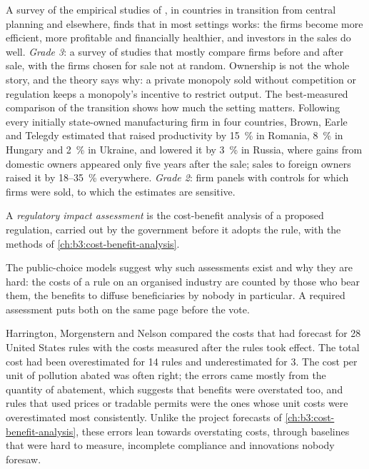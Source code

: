 \begin{record}
A survey of the empirical studies of , in countries in transition from
central planning and elsewhere, finds that in most settings  works:
the firms become more efficient, more profitable and financially healthier, and
investors in the sales do well. %
\emph{Grade 3}: a survey of studies that mostly compare firms before and after sale,
with the firms chosen for sale not at random.
Ownership is not the whole story, and the theory says why: a private monopoly sold without competition
or regulation keeps a monopoly's incentive to restrict output.
The best-measured comparison of the transition shows how much the setting matters.
Following every initially state-owned manufacturing firm in four countries, Brown,
Earle and Telegdy estimated that  raised productivity by 15~\% in
Romania, 8~\% in Hungary and 2~\% in Ukraine, and lowered it by 3~\% in Russia, where
gains from domestic owners appeared only five years after the sale; sales to
foreign owners raised it by 18--35~\% everywhere. %
\emph{Grade 2}: firm panels with controls for which firms were sold, to which the
estimates are sensitive.
\end{record}

\begin{definition}\label{def:b3:interest-groups-and-regulation:ria}
A \emph{regulatory impact assessment} is the cost-benefit analysis of a proposed
regulation, carried out by the government before it adopts the rule, with the
methods of \cref{ch:b3:cost-benefit-analysis}.
\end{definition}

The public-choice models suggest why such assessments exist and why they are hard:
the costs of a rule on an organised industry are counted by those who bear them,
the benefits to diffuse beneficiaries by nobody in particular. A required
assessment puts both on the same page before the vote.

\begin{record}
Harrington, Morgenstern and Nelson compared the costs that  had forecast for 28 United States rules with the costs measured after
the rules took effect. The total cost had been overestimated for 14 rules and
underestimated for 3. The cost per unit of pollution abated was often right; the
errors came mostly from the quantity of abatement, which suggests that benefits were
overstated too, and rules that used prices or tradable permits were the ones whose
unit costs were overestimated most consistently. %
Unlike the project forecasts of \cref{ch:b3:cost-benefit-analysis}, these errors lean towards overstating costs, through
baselines that were hard to measure, incomplete compliance and innovations nobody
foresaw.
\end{record}

